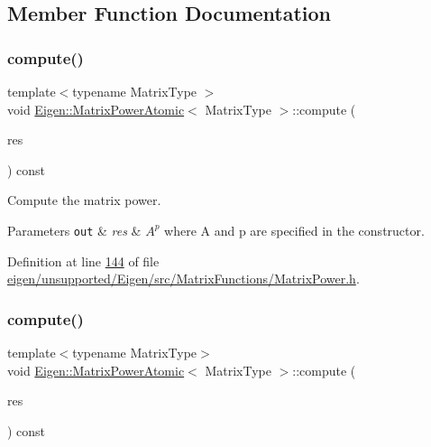 \subsection{Member Function Documentation}
\mbox{\label{class_eigen_1_1_matrix_power_atomic_ac3cdfb54a5b60079d068784534cbc174}} 
\subsubsection{\texorpdfstring{compute()}{compute()}\hspace{0.1cm}{\footnotesize\ttfamily [1/2]}}
{\footnotesize\ttfamily template$<$typename Matrix\+Type $>$ \\
void \hyperlink{class_eigen_1_1_matrix_power_atomic}{Eigen\+::\+Matrix\+Power\+Atomic}$<$ Matrix\+Type $>$\+::compute (\begin{DoxyParamCaption}\item[{\hyperlink{group___core___module_class_eigen_1_1_block}{Result\+Type} \&}]{res }\end{DoxyParamCaption}) const}



Compute the matrix power. 


\begin{DoxyParams}[1]{Parameters}
\mbox{\tt out}  & {\em res} & $ A^p $ where A and p are specified in the constructor. \\
\hline
\end{DoxyParams}


Definition at line \hyperlink{eigen_2unsupported_2_eigen_2src_2_matrix_functions_2_matrix_power_8h_source_l00144}{144} of file \hyperlink{eigen_2unsupported_2_eigen_2src_2_matrix_functions_2_matrix_power_8h_source}{eigen/unsupported/\+Eigen/src/\+Matrix\+Functions/\+Matrix\+Power.\+h}.

\mbox{\label{class_eigen_1_1_matrix_power_atomic_ac3cdfb54a5b60079d068784534cbc174}} 
\subsubsection{\texorpdfstring{compute()}{compute()}\hspace{0.1cm}{\footnotesize\ttfamily [2/2]}}
{\footnotesize\ttfamily template$<$typename Matrix\+Type$>$ \\
void \hyperlink{class_eigen_1_1_matrix_power_atomic}{Eigen\+::\+Matrix\+Power\+Atomic}$<$ Matrix\+Type $>$\+::compute (\begin{DoxyParamCaption}\item[{\hyperlink{group___core___module_class_eigen_1_1_block}{Result\+Type} \&}]{res }\end{DoxyParamCaption}) const}



